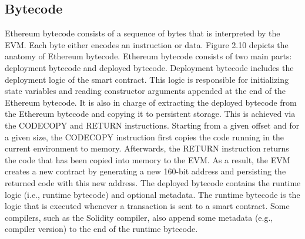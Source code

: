     \subsection{Bytecode}
        Ethereum bytecode consists of a sequence of bytes that is interpreted by the EVM.
        Each byte either encodes an instruction or data.
        Figure 2.10 depicts the anatomy of Ethereum bytecode.
        Ethereum bytecode consists of two main parts: deployment bytecode and deployed bytecode.
        Deployment bytecode includes the deployment logic of the smart contract.
        This logic is responsible for initializing state variables and reading constructor arguments appended at the end of the Ethereum bytecode.
        It is also in charge of extracting the deployed bytecode from the Ethereum bytecode and copying it to persistent storage.
        This is achieved via the CODECOPY and RETURN instructions.
        Starting from a given offset and for a given size, the CODECOPY instruction first copies the code running in the current environment to memory.
        Afterwards, the RETURN instruction returns the code that has been copied into memory to the EVM.
        As a result, the EVM creates a new contract by generating a new 160-bit address and persisting the returned code with this new address.
        The deployed bytecode contains the runtime logic (i.e., runtime bytecode) and optional metadata.
        The runtime bytecode is the logic that is executed whenever a transaction is sent to a smart contract.
        Some compilers, such as the Solidity compiler, also append some metadata (e.g., compiler version) to the end of the runtime bytecode.

